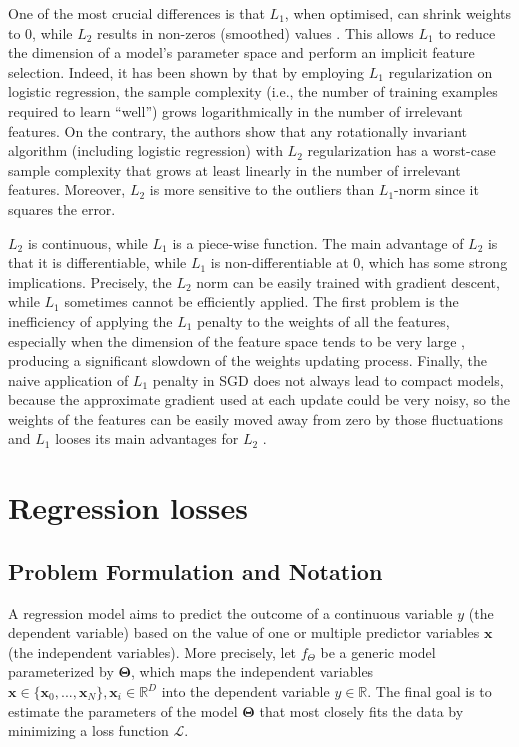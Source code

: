 \documentclass[sn-mathphys-num]{sn-jnl}%
\renewcommand\vec{\mathbf}
\begin{document}
One of the most crucial differences is that $L_1$, when optimised, can shrink weights to 0, while $L_2$ results in non-zeros (smoothed) values \cite{ML_1,ML_2,ML_3,andrew-ng-l1-l2,l1_vs_l2}. This allows $L_1$ to reduce the dimension of a model's parameter space and perform an implicit feature selection. Indeed, it has been shown by \cite{andrew-ng-l1-l2} that by employing $L_1$ regularization on logistic regression, the sample complexity (i.e., the number of training examples
required to learn “well”) grows logarithmically in the number of irrelevant features.
On the contrary, the authors show that any rotationally invariant algorithm (including logistic regression) with $L_2$ regularization has a worst-case sample complexity that grows at least linearly in the number of irrelevant features.
Moreover, $L_2$ is more sensitive to the outliers than $L_1$-norm since it squares the error.

$L_2$ is continuous, while $L_1$ is a piece-wise function.
The main advantage of $L_2$ is that it is differentiable, while  $L_1$ is non-differentiable at $0$, which has some strong implications. 
Precisely, the $L_2$ norm can be easily trained with gradient descent, while $L_1$ sometimes cannot be efficiently applied.
The first problem is the inefficiency of applying the $L_1$ penalty to the weights of all the features, especially when the dimension of the feature space tends to be very large \cite{l1_sgd},
producing a significant slowdown of the weights updating process. Finally, the naive application of $L_1$ penalty in SGD does not always lead to compact models, because the approximate gradient used at each update could be very noisy, so the weights of the features can be easily moved away from zero by those fluctuations and $L_1$ looses its main advantages for $L_2$ \cite{l1_sgd}.

\section{Regression losses} \label{sec:regression}
\subsection{Problem Formulation and Notation}
    A regression model aims to predict the outcome of a continuous variable $y$ (the dependent variable) based on the value of one or multiple predictor variables $\vec{x}$ (the independent variables). 
    More precisely, let $f_{\Theta}$ be a generic model parameterized by $\vec{\Theta}$, which maps the independent variables $\vec{x}\in \{\vec{x}_0,...,\vec{x}_N\}, \vec{x}_i \in \mathbb{R}^D$ into the dependent variable $y\in \mathbb{R}$.
    The final goal is to estimate the parameters of the model $\vec{\Theta}$ that most closely fits the data by minimizing a loss function $\mathcal{L}$.
    
\end{document}

